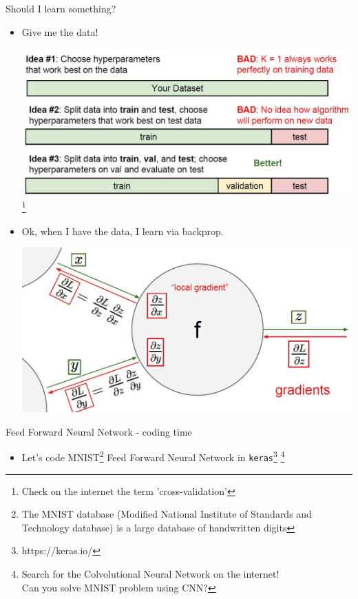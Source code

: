 \documentclass[aspectratio=169]{beamer}
\begin{document}
\begin{frame}{Should I learn something?}
    \begin{itemize}
        \item Give me the data!
        \begin{center}
            \includegraphics[scale=0.2]{./images/valid.JPG}\footnote{Check on the internet the term 'cross-validation'}
        \end{center}
        \item Ok, when I have the data, I learn via backprop.    
        \begin{center}
            \includegraphics[scale=0.2]{./images/backprop.JPG}
        \end{center}
    \end{itemize}
\end{frame}
\begin{frame}{Feed Forward Neural Network - coding time}
        \begin{itemize}
        \item Let's code MNIST\footnote{The MNIST database (Modified National Institute of Standards and Technology database) is a large database of handwritten digits} Feed Forward Neural Network in \texttt{keras}\footnote{https://keras.io/} 
        \footnote{Search for the Colvolutional Neural Network on the internet!\\Can you solve MNIST problem using CNN?}
    \end{itemize}
\end{frame}
\end{document}
